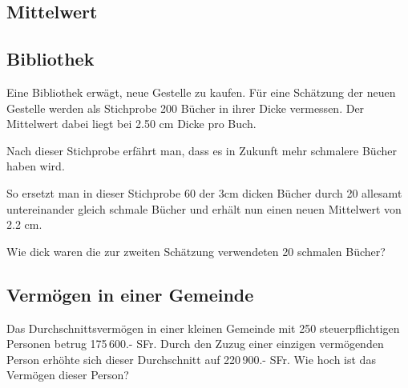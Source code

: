 \subsection*{Mittelwert}

\subsection{Bibliothek}
Eine Bibliothek erwägt, neue Gestelle zu kaufen. Für eine Schätzung
der neuen Gestelle werden als Stichprobe 200 Bücher in ihrer Dicke
vermessen. Der Mittelwert dabei liegt bei 2.50 cm Dicke pro Buch.

Nach dieser Stichprobe erfährt man, dass es in Zukunft mehr schmalere
Bücher haben wird.

So ersetzt man in dieser Stichprobe 60 der 3cm dicken Bücher durch 20 allesamt untereinander gleich
schmale Bücher und erhält nun einen neuen Mittelwert von 2.2 cm.

Wie dick waren die zur zweiten Schätzung verwendeten 20 schmalen Bücher?


\newpage



\newpage


\subsection{Vermögen in einer Gemeinde}
Das Durchschnittsvermögen in einer kleinen Gemeinde mit 250
steuerpflichtigen Personen betrug 175\,600.- SFr.
Durch den Zuzug einer einzigen vermögenden Person erhöhte sich dieser
Durchschnitt auf 220\,900.- SFr. Wie hoch ist das Vermögen dieser Person?

